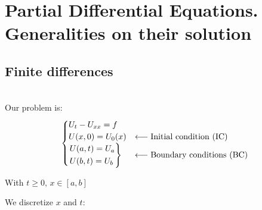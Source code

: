 \section{Partial Differential Equations. Generalities on their solution}

\subsection{Finite differences}

\begin{example}
  \-\\Our problem is:
  \[
    \begin{cases}
      U_t - U_{xx} = f\\
      U(x,0) = U_0(x) &\longleftarrow\text{Initial condition (IC)}\\
      \begin{rcases}
        U(a,t) = U_a \\
        U(b,t) = U_b
      \end{rcases} &\longleftarrow\text{Boundary conditions (BC)}\\
    \end{cases}
  \]
  
  With $t\geq 0, \, x\in[a,b]$
\end{example}

We discretize $x$ and $t$:

